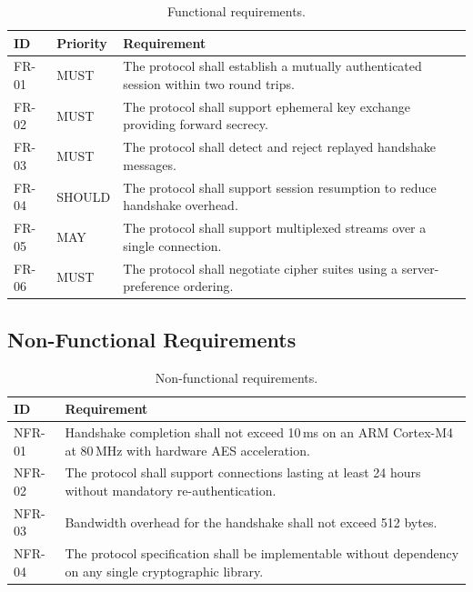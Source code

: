 \documentclass[
    language=english,
    doctype=article,
    institution=none,
]{../../omnilatex}
\begin{document}
\begin{table}[htbp]
    \centering
    \caption{Functional requirements.}
    \label{tab:func-req}
    \begin{tabular}{@{}llp{5.5cm}@{}}
        \toprule
        \textbf{ID} & \textbf{Priority} & \textbf{Requirement} \\
        \midrule
        FR-01 & MUST & The protocol shall establish a mutually authenticated
            session within two round trips. \\
        FR-02 & MUST & The protocol shall support ephemeral key exchange
            providing forward secrecy. \\
        FR-03 & MUST & The protocol shall detect and reject replayed
            handshake messages. \\
        FR-04 & SHOULD & The protocol shall support session resumption to
            reduce handshake overhead. \\
        FR-05 & MAY   & The protocol shall support multiplexed streams over
            a single connection. \\
        FR-06 & MUST & The protocol shall negotiate cipher suites using a
            server-preference ordering. \\
        \bottomrule
    \end{tabular}
\end{table}

\subsection{Non-Functional Requirements}

\begin{table}[htbp]
    \centering
    \caption{Non-functional requirements.}
    \label{tab:nfr}
    \begin{tabular}{@{}lp{7cm}@{}}
        \toprule
        \textbf{ID} & \textbf{Requirement} \\
        \midrule
        NFR-01 & Handshake completion shall not exceed 10\,ms on an ARM Cortex-M4
            at 80\,MHz with hardware AES acceleration. \\
        NFR-02 & The protocol shall support connections lasting at least 24 hours
            without mandatory re-authentication. \\
        NFR-03 & Bandwidth overhead for the handshake shall not exceed 512 bytes. \\
        NFR-04 & The protocol specification shall be implementable without
            dependency on any single cryptographic library. \\
        \bottomrule
    \end{tabular}
\end{table}
\end{document}
